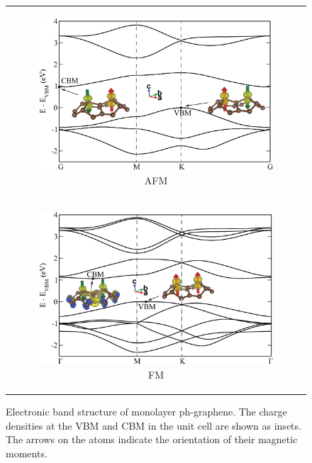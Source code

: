 \begin{figure}[htbp]
\centering
  \begin{tabular}{c}
  \begin{subfigure}{0.7\textwidth}
    \includegraphics[width=\textwidth]{PG_band-AFM.eps}%
    \caption{AFM}
  \end{subfigure} \\
  \begin{subfigure}{0.7\textwidth}
    \includegraphics[width=\textwidth]{PG_band-FM.eps}%
    \caption{FM}
  \end{subfigure}    
  \end{tabular}
\caption{Electronic band structure of monolayer ph-graphene. The charge densities at the VBM and CBM in the unit cell are shown as insets. The arrows on the atoms indicate the orientation of their magnetic moments.\label{electronic} }
\end{figure}


